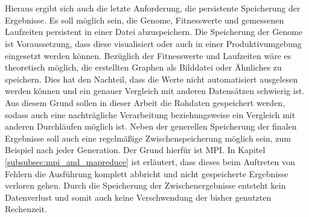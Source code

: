 \\\\
Hieraus ergibt sich auch die letzte Anforderung, die persistente Speicherung der Ergebnisse. Es soll möglich sein, die Genome, Fitnesswerte und gemessenen Laufzeiten persistent in einer Datei abzuspeichern. Die Speicherung der Genome ist Voraussetzung, dass diese visualisiert oder auch in einer Produktivumgebung eingesetzt werden können. Bezüglich der Fitnesswerte und Laufzeiten wäre es theoretisch möglich, die erstellten Graphen als Bilddatei oder Ähnliches zu speichern. Dies hat den Nachteil, dass die Werte nicht automatisiert ausgelesen werden können und ein genauer Vergleich mit anderen Datensätzen schwierig ist. Aus diesem Grund sollen in dieser Arbeit die Rohdaten gespeichert werden, sodass auch eine nachträgliche Verarbeitung beziehungsweise ein Vergleich mit anderen Durchläufen möglich ist. Neben der generellen Speicherung der finalen Ergebnisse soll auch eine regelmäßige Zwischenspeicherung möglich sein, zum Beispiel nach jeder Generation. Der Grund hierfür ist \ac{MPI}. In Kapitel \ref{subsubsec:mpi_and_mapreduce} ist erläutert, dass dieses beim Auftreten von Fehlern die Ausführung komplett abbricht und nicht gespeicherte Ergebnisse verloren gehen. Durch die Speicherung der Zwischenergebnisse entsteht kein Datenverlust und somit auch keine Verschwendung der bisher genutzten Rechenzeit.


